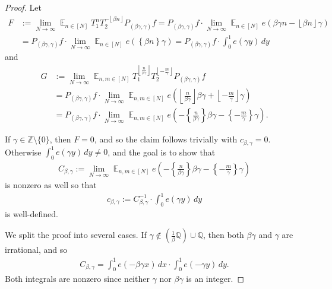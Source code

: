 \documentclass[11pt]{amsart}
\theoremstyle{definition}
\DeclareMathOperator*{\E}{\mathbb{E}}
\newcommand{\Q}{{\mathbb Q}}
\newcommand{\Z}{{\mathbb Z}}
\newcommand{\inv}{^{-1}}
\newcommand{\1}{{\mathbf{1}}}
\newcommand{\brac}[1]{\mathopen{}\left( #1 \mathclose{}\right)}
\newcommand{\floor}[1]{{\left \lfloor #1 \right \rfloor}}
\newcommand{\rem}[1]{\left \{ #1 \right \}}
\begin{document}
\begin{proof}
Let 
\begin{align*}
F &:= \lim_{N\to\infty}\E_{n\in[N]} T_1^n T_2^{-\floor{\beta n}} P_{(\beta \gamma, \gamma)} f = P_{(\beta \gamma, \gamma)} f \cdot \lim_{N\to\infty}\E_{n\in[N]} e(\beta\gamma n - \floor{\beta n}\gamma)\\
&= P_{(\beta \gamma, \gamma)} f \cdot \lim_{N\to\infty}\E_{n\in[N]} e(\rem{\beta n}\gamma) = P_{(\beta \gamma, \gamma)} f \cdot \int_0^1 e(\gamma y)\, dy
\end{align*}
and 
\begin{align*}
G &:= \lim_{N\to\infty}\E_{n, m\in[N]} T_1^{\floor{\frac{n}{\beta \gamma}}} T_2^{\floor{-\frac{m}{\gamma}}} P_{(\beta \gamma, \gamma)} f\\
&= P_{(\beta \gamma, \gamma)} f\cdot \lim_{N\to\infty}\E_{n, m\in[N]} e\brac{\floor{\frac{n}{\beta \gamma}}\beta \gamma + \floor{-\frac{m}{\gamma}}\gamma}\\
&= P_{(\beta \gamma, \gamma)} f\cdot \lim_{N\to\infty}\E_{n, m\in[N]} e\brac{-\rem{\frac{n}{\beta \gamma}}\beta \gamma - \rem{-\frac{m}{\gamma}}\gamma}.
\end{align*}

If $\gamma\in \Z\setminus\{0\}$, then $F = 0$, and so the claim follows trivially with $c_{\beta, \gamma} = 0$. 
Otherwise $\int_0^1 e(\gamma y)\, dy\neq 0$, and the goal is to show that
\begin{align*}
    C_{\beta, \gamma} := \lim_{N\to\infty}\E_{n, m\in[N]} e\brac{-\rem{\frac{n}{\beta \gamma}}\beta \gamma - \rem{-\frac{m}{\gamma}}\gamma}
\end{align*}
is nonzero as well so that
\begin{align*}
    c_{\beta, \gamma} := C_{\beta, \gamma}\inv\cdot\int_0^1 e(\gamma y)\, dy
\end{align*}
is well-defined.

We split the proof into several cases.
If $\gamma \notin(\frac{1}{\beta} \Q)\cup \Q$, then both $\beta \gamma$ and $\gamma$ are irrational, and so 
\begin{align*}
	C_{\beta, \gamma} = \int_0^1 e(-\beta \gamma x)\, dx\cdot \int_0^1 e(-\gamma y)\, dy.
\end{align*}
Both integrals are nonzero since neither $\gamma$ nor $\beta\gamma$ is an integer.



\end{proof}
\end{document}
